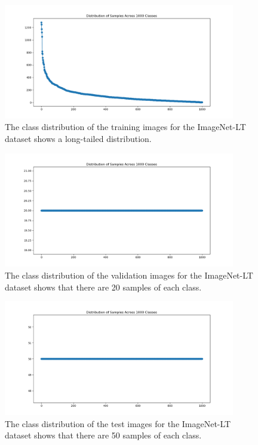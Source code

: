 \begin{figure}[h!]
    \centering
    \includegraphics[width=0.9\textwidth]{Images/Plots/class_distribution_train.png}
    \caption{The class distribution of the training images for the ImageNet-LT dataset shows a long-tailed distribution.}
    \label{fig:IN-train}
\end{figure}

\begin{figure}[h!]
    \centering
    \includegraphics[width=0.9\textwidth]{Images/Plots/class_distribution_val.png}
    \caption{The class distribution of the validation images for the ImageNet-LT dataset shows that there are 20 samples of each class.}
    \label{fig:IN-val}
\end{figure}

\begin{figure}[h!]
    \centering
    \includegraphics[width=0.9\textwidth]{Images/Plots/class_distribution_test.png}
    \caption{The class distribution of the test images for the ImageNet-LT dataset shows that there are 50 samples of each class.}
    \label{fig:IN-test}
\end{figure}


